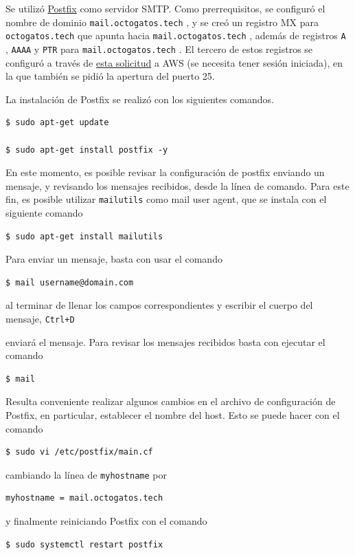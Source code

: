 \documentclass{article}
\newcommand{\ttt}[1]{%
\texttt{#1}%
}
\begin{document}
Se utiliz\'o \href{http://www.postfix.org/}{Postfix} como
servidor SMTP.   Como prerrequisitos, se configur\'o el
nombre de dominio \ttt{mail.octogatos.tech}, y se cre\'o
un registro MX para \ttt{octogatos.tech} que apunta hacia
\ttt{mail.octogatos.tech}, adem\'as de registros \ttt{A},
\ttt{AAAA} y \ttt{PTR} para \ttt{mail.octogatos.tech}.
El tercero de estos registros se configur\'o a trav\'es
de \href{https://aws-portal.amazon.com/gp/aws/html-forms-controller/contactus/ec2-email-limit-rdns-request}{esta solicitud}
a AWS (se necesita tener sesi\'on iniciada), en la que
tambi\'en se pidi\'o la apertura del puerto 25.

La instalaci\'on de Postfix se realiz\'o con los
siguientes comandos.
\begin{lstlisting}
$ sudo apt-get update

$ sudo apt-get install postfix -y
\end{lstlisting}

En este momento, es posible revisar la configuraci\'on
de postfix enviando un mensaje, y revisando los mensajes
recibidos, desde la l\'inea de comando.   Para este fin,
es posible utilizar \ttt{mailutils} como mail user
agent, que se instala con el siguiente comando
\begin{lstlisting}
$ sudo apt-get install mailutils
\end{lstlisting}

Para enviar un mensaje, basta con usar el comando
\begin{lstlisting}
$ mail username@domain.com
\end{lstlisting}
al terminar de llenar los campos correspondientes
y escribir el cuerpo del mensaje, \ttt{Ctrl+D}
enviar\'a el mensaje.   Para revisar los mensajes
recibidos basta con ejecutar el comando
\begin{lstlisting}
$ mail
\end{lstlisting}

Resulta conveniente realizar algunos cambios en
el archivo de configuraci\'on de Postfix, en
particular, establecer el nombre del host.   Esto
se puede hacer con el comando
\begin{lstlisting}
$ sudo vi /etc/postfix/main.cf
\end{lstlisting}
cambiando la l\'inea de \ttt{myhostname} por
\begin{lstlisting}
myhostname = mail.octogatos.tech
\end{lstlisting}
y finalmente reiniciando Postfix con el comando
\begin{lstlisting}
$ sudo systemctl restart postfix
\end{lstlisting}
\end{document}
